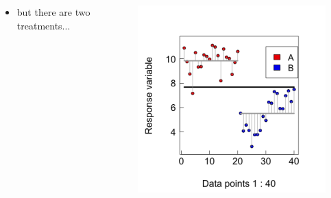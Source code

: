 \documentclass{beamer}
\begin{document}
\begin{frame}{}
  \begin{columns}[onlytextwidth] %
    \begin{column}{0.44\textwidth}
  \begin{itemize}
    \item but there are two treatments...
  \end{itemize}
    \end{column}
    \hspace{0.02\textwidth} %
    \begin{column}{0.6\textwidth}
      \begin{center}
        \includegraphics[width=0.9\textwidth]{lectures/day_1_intro_to_mems/figures/unnamed-chunk-22-1.png}
      \end{center}
    \end{column}
  \end{columns}
\end{frame}
\end{document}
